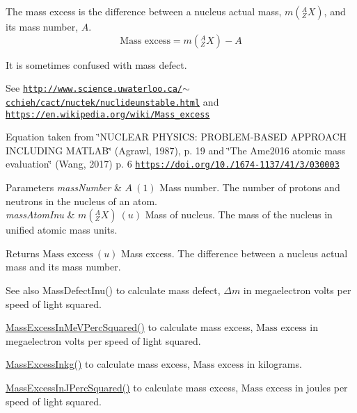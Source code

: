 The mass excess is the difference between a nucleus actual mass, $m({^A_ZX})$, and its mass number, $A$. \[\text{Mass excess} = m({^A_ZX}) - A\]

It is sometimes confused with mass defect.

See \href{http://www.science.uwaterloo.ca/~cchieh/cact/nuctek/nuclideunstable.html}{\tt http\+://www.\+science.\+uwaterloo.\+ca/$\sim$cchieh/cact/nuctek/nuclideunstable.\+html} and \href{https://en.wikipedia.org/wiki/Mass_excess}{\tt https\+://en.\+wikipedia.\+org/wiki/\+Mass\+\_\+excess}

Equation taken from \char`\"{}\+N\+U\+C\+L\+E\+A\+R P\+H\+Y\+S\+I\+C\+S\+: P\+R\+O\+B\+L\+E\+M-\/\+B\+A\+S\+E\+D A\+P\+P\+R\+O\+A\+C\+H I\+N\+C\+L\+U\+D\+I\+N\+G M\+A\+T\+L\+A\+B\char`\"{} (Agrawl, 1987), p. 19 and \char`\"{}\+The Ame2016 atomic mass evaluation\char`\"{} (Wang, 2017) p. 6 \href{https://doi.org/10.1088/1674-1137/41/3/030003}{\tt https\+://doi.\+org/10./1674-\/1137/41/3/030003}


\begin{DoxyParams}{Parameters}
{\em mass\+Number} & $A\ (1)$ Mass number. The number of protons and neutrons in the nucleus of an atom. \\
\hline
{\em mass\+Atom\+Inu} & $m({^A_ZX})\ (u)$ Mass of nucleus. The mass of the nucleus in unified atomic mass units. \\
\hline
\end{DoxyParams}
\begin{DoxyReturn}{Returns}
$\text{Mass excess}\ (u)$ Mass excess. The difference between a nucleus actual mass and its mass number. 
\end{DoxyReturn}
\begin{DoxySeeAlso}{See also}
Mass\+Defect\+Inu() to calculate mass defect, $\Delta m$ in megaelectron volts per speed of light squared. 

\hyperlink{group___mass_excess_ga99a93b88df3425b7a153c32c05fa5a88}{Mass\+Excess\+In\+Me\+V\+Perc\+Squared()} to calculate mass excess, $\text{Mass excess}$ in megaelectron volts per speed of light squared. 

\hyperlink{group___mass_excess_gab72a3640886092be8b9c9662020a2306}{Mass\+Excess\+Inkg()} to calculate mass excess, $\text{Mass excess}$ in kilograms. 

\hyperlink{group___mass_excess_ga3eb487f438543e950b9c5aece4c5b409}{Mass\+Excess\+In\+J\+Perc\+Squared()} to calculate mass excess, $\text{Mass excess}$ in joules per speed of light squared. 
\end{DoxySeeAlso}
